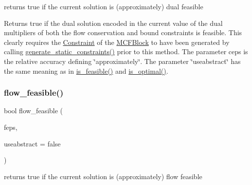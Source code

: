returns true if the current solution is (approximately) dual feasible 

Returns true if the dual solution encoded in the current value of the dual multipliers of both the flow conservation and bound constraints is feasible. This clearly requires the \mbox{\hyperlink{class_s_m_spp__di__unipi__it_1_1_constraint}{Constraint}} of the \mbox{\hyperlink{class_s_m_spp__di__unipi__it_1_1_m_c_f_block}{M\+C\+F\+Block}} to have been generated by calling \mbox{\hyperlink{class_s_m_spp__di__unipi__it_1_1_m_c_f_block_a33f94035590874ef8616982e11e7bb43}{generate\+\_\+static\+\_\+constraints()}} prior to this method. The parameter ceps is the relative accuracy defining \char`\"{}approximately\char`\"{}. The parameter \char`\"{}useabstract\char`\"{} has the same meaning as in \mbox{\hyperlink{class_s_m_spp__di__unipi__it_1_1_m_c_f_block_a162cd7d8375d705f0b15d8e847098763}{is\+\_\+feasible()}} and \mbox{\hyperlink{class_s_m_spp__di__unipi__it_1_1_m_c_f_block_a0b1e7ff87a97e692c97f52f096f6eb50}{is\+\_\+optimal()}}. \mbox{\label{class_s_m_spp__di__unipi__it_1_1_m_c_f_block_a45168e035a71794f255d1355e775596c}} 
\subsubsection{\texorpdfstring{flow\+\_\+feasible()}{flow\_feasible()}}
{\footnotesize\ttfamily bool flow\+\_\+feasible (\begin{DoxyParamCaption}\item[{\mbox{\hyperlink{class_s_m_spp__di__unipi__it_1_1_m_c_f_block_a956c123a5a6b2b52f033ca1987acd80e}{c\+\_\+\+F\+Number}}}]{feps,  }\item[{bool}]{useabstract = {\ttfamily false} }\end{DoxyParamCaption})}



returns true if the current solution is (approximately) flow feasible 

